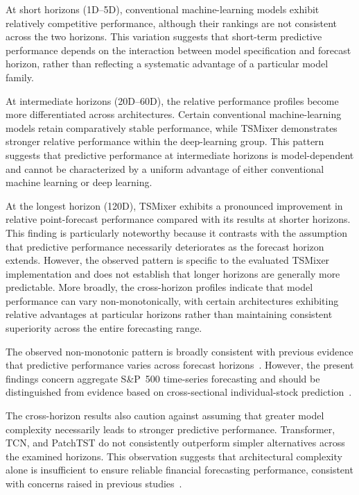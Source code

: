 \documentclass[runningheads,orivec]{llncs}
\begin{document}
At short horizons (1D--5D), conventional machine-learning models exhibit relatively competitive performance, although their rankings are not consistent across the two horizons. This variation suggests that short-term predictive performance depends on the interaction between model specification and forecast horizon, rather than reflecting a systematic advantage of a particular model family.

At intermediate horizons (20D--60D), the relative performance profiles become more differentiated across architectures. Certain conventional machine-learning models retain comparatively stable performance, while TSMixer demonstrates stronger relative performance within the deep-learning group. This pattern suggests that predictive performance at intermediate horizons is model-dependent and cannot be characterized by a uniform advantage of either conventional machine learning or deep learning.

At the longest horizon (120D), TSMixer exhibits a pronounced improvement in relative point-forecast performance compared with its results at shorter horizons. This finding is particularly noteworthy because it contrasts with the assumption that predictive performance necessarily deteriorates as the forecast horizon extends. However, the observed pattern is specific to the evaluated TSMixer implementation and does not establish that longer horizons are generally more predictable. More broadly, the cross-horizon profiles indicate that model performance can vary non-monotonically, with certain architectures exhibiting relative advantages at particular horizons rather than maintaining consistent superiority across the entire forecasting range.

The observed non-monotonic pattern is broadly consistent with previous evidence that predictive performance varies across forecast horizons~\cite{quaedvlieg2021,xu2020}. However, the present findings concern aggregate S\&P~500 time-series forecasting and should be distinguished from evidence based on cross-sectional individual-stock prediction~\cite{nechvatalova2024}.

The cross-horizon results also caution against assuming that greater model complexity necessarily leads to stronger predictive performance. Transformer, TCN, and PatchTST do not consistently outperform simpler alternatives across the examined horizons. This observation suggests that architectural complexity alone is insufficient to ensure reliable financial forecasting performance, consistent with concerns raised in previous studies~\cite{gu2020,welch2008}.
\end{document}
